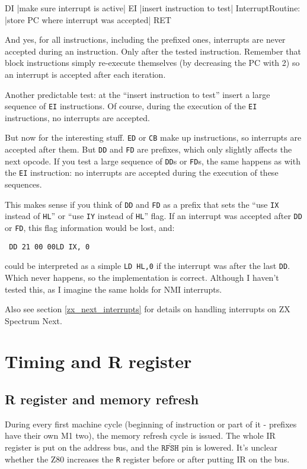 \begin{tcblisting}{}
	DI
	|make sure interrupt is active|
	EI
	|insert instruction to test|
InterruptRoutine:
	|store PC where interrupt was accepted|
	RET
\end{tcblisting}

And yes, for all instructions, including the prefixed ones, interrupts are never accepted during an instruction. Only after the tested instruction. Remember that block instructions simply re-execute themselves (by decreasing the PC with 2) so an interrupt is accepted after each iteration.

Another predictable test: at the ``insert instruction to test'' insert a large sequence of {\tt EI} instructions. Of course, during the execution of the {\tt EI} instructions, no interrupts are accepted. 

But now for the interesting stuff. {\tt ED} or {\tt CB} make up instructions, so interrupts are accepted after them. But {\tt DD} and {\tt FD} are prefixes, which only slightly affects the next opcode. If you test a large sequence of {\tt DD}s or {\tt FD}s, the same happens as with the {\tt EI} instruction: no interrupts are accepted during the execution of these sequences.

This makes sense if you think of {\tt DD} and {\tt FD} as a prefix that sets the ``use {\tt IX} instead of {\tt HL}'' or ``use {\tt IY} instead of {\tt HL}'' flag. If an interrupt was accepted after {\tt DD} or {\tt FD}, this flag information would be lost, and:

{\tt 
	{\qquad}DD 21 00 00{\qquad}LD IX, 0
}

could be interpreted as a simple {\tt LD HL,0} if the interrupt was after the last {\tt DD}. Which never happens, so the implementation is correct. Although I haven't tested this, as I imagine the same holds for NMI interrupts.

Also see section \ref{zx_next_interrupts} for details on handling interrupts on ZX Spectrum Next.


\pagebreak
\section{Timing and R register}

\subsection{R register and memory refresh}

During every first machine cycle (beginning of instruction or part of it - prefixes have their own M1 two), the memory refresh cycle is issued. The whole IR register is put on the address bus, and the $\mathtt{\overline{RFSH}}$ pin is lowered.  It's unclear whether the Z80 increases the {\tt R} register before or after putting IR on the bus. 

